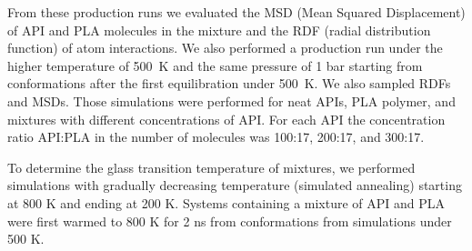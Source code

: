 From these production runs we evaluated the MSD (Mean Squared Displacement) of API and PLA molecules in the mixture and the RDF (radial distribution function) of atom interactions. We also performed a production run under the higher temperature of 500~K and the same pressure of 1 bar starting from conformations after the first equilibration under 500~K. We also sampled RDFs and MSDs. Those simulations were performed for neat APIs, PLA polymer, and mixtures with different concentrations of API. For each API the concentration ratio API:PLA in the number of molecules was 100:17, 200:17, and 300:17. 

To determine the glass transition temperature of mixtures, we performed simulations with gradually decreasing temperature (simulated annealing) starting at 800 K and ending at 200 K. Systems containing a mixture of API and PLA were first warmed to 800 K for 2 ns from conformations from simulations under 500 K.      